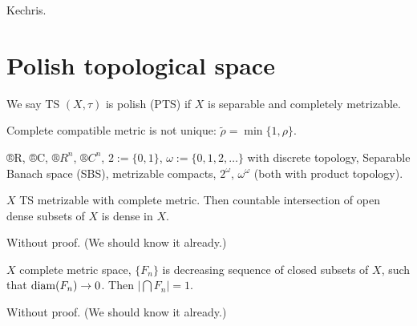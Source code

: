 \documentclass[12pt]{article}					%
\begin{document}

\begin{poznamka}[Literature]
	Kechris.
\end{poznamka}

\section{Polish topological space}

\begin{definice}
	We say TS $(X, τ)$ is polish (PTS) if $X$ is separable and completely metrizable.
\end{definice}

\begin{poznamka}
	Complete compatible metric is not unique: $\tilde ρ = \min\{1, ρ\}$.
\end{poznamka}

\begin{priklady}
	®R, ®C, $®R^n$, $®C^n$, $2 := \{0, 1\}$, $ω := \{0, 1, 2, …\}$ with discrete topology, Separable Banach space (SBS), metrizable compacts, $2^ω$, $ω^ω$ (both with product topology).
\end{priklady}

\begin{veta}[Baire]
	$X$ TS metrizable with complete metric. Then countable intersection of open dense subsets of $X$ is dense in $X$.

	\begin{dukazin}
		Without proof. (We should know it already.)
	\end{dukazin}
\end{veta}

\begin{veta}
	$X$ complete metric space, $\{F_n\}$ is decreasing sequence of closed subsets of $X$, such that $\operatorname{diam}(F_n) \rightarrow 0$. Then $|\bigcap F_n| = 1$.

	\begin{dukazin}
		Without proof. (We should know it already.)
	\end{dukazin}
\end{veta}
\end{document}
